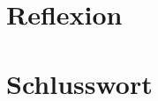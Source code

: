 \documentclass[10pt,a4paper,oneside]{99_fhnwreport}
\begin{document}
\begin{otherlanguage}{ngerman}
\section{Reflexion}\label{sec:reflexion}

\clearpage


\section{Schlusswort}\label{sec:schlusswort}

\clearpage




\end{otherlanguage}
\end{document}
